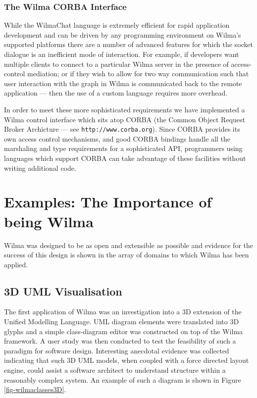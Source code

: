 \documentclass[runningheads]{cl2emult}
\newcommand{\url}[1]{{\small{\tt #1}}}
\begin{document}
\subsubsection{The Wilma CORBA Interface}

While the WilmaChat language is extremely efficient for rapid application
development and can be driven by any programming environment on Wilma's
supported platforms there are a number of advanced features for which the
socket dialogue is an inefficient mode of interaction.  For example, if
developers want multiple clients to connect to a particular Wilma server in
the presence of access-control mediation; or if they wish to allow for
two way communication such that user interaction with the graph in
Wilma is communicated back to the remote application --- then the use
of a custom language requires more overhead.

In order to meet these more sophisticated requirements we have implemented a
Wilma control interface which sits atop CORBA (the Common Object Request
Broker Archicture --- see \url{http://www.corba.org}).  Since CORBA provides
its own access control mechanisms, and good CORBA bindings handle all the
marshaling and type requirements for a sophisticated API, programmers using
languages which support CORBA can take advantage of these facilities without
writing additional code.

\section{Examples: The Importance of being Wilma}
\label{sec:examples}
Wilma was designed to be as open and extensible as possible and
evidence for the success of this design is shown in the array of
domains to which Wilma has been applied.

\subsection{3D UML Visualisation} \label{sec:3duml}
The first application of Wilma was an investigation into a 3D
extension of the Unified Modelling Language\cite{dwyer013D-UML}.
UML diagram elements were translated into 3D glyphs and a simple
class-diagram editor was constructed on top of the Wilma framework.  A user study
was then conducted to test the feasibility of such a paradigm for
software design.  Interesting anecdotal evidence was collected
indicating that such 3D UML models, when coupled with a force directed
layout engine, could assist a software architect to understand structure
within a reasonably complex system.  An example of such a diagram is
shown in Figure \ref{fig-wilmaclasses3D}.
\end{document}
